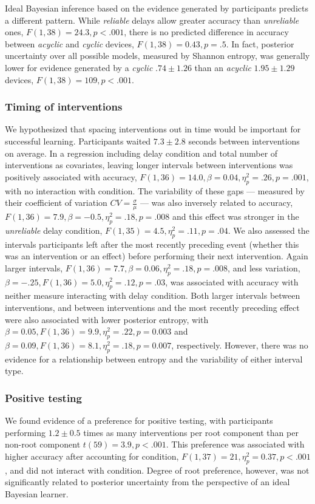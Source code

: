 \documentclass[10pt,letterpaper]{article}
\begin{document}
Ideal Bayesian inference based on the evidence generated by participants predicts a different pattern.  While \emph{reliable} delays allow greater accuracy than \emph{unreliable} ones, $F(1,38) = 24.3, p<.001$, there is no predicted difference in accuracy between \emph{acyclic} and \emph{cyclic} devices, $F(1, 38)= 0.43, p=.5$.  In fact, posterior uncertainty over all possible models, measured by Shannon entropy, was generally lower for evidence generated by a \emph{cyclic} $.74\pm1.26$ than an \emph{acyclic} $1.95\pm1.29$ devices, $F(1,38) = 109, p<.001$.%

\subsubsection{Timing of interventions}

We hypothesized that spacing interventions out in time would be important for successful learning.  Participants waited $7.3\pm2.8$ seconds between interventions on average.  In a regression including delay condition and total number of interventions as covariates, leaving longer intervals between interventions was positively associated with accuracy, $F(1,36)=14.0, \beta = 0.04, \eta^2_p=.26, p=.001$, with no interaction with condition.  The variability of these gaps --- measured by their coefficient of variation $CV = \frac{\sigma}{\mu}$ --- was also inversely related to accuracy, $F(1,36)=7.9, \beta = -0.5, \eta^2_p=.18, p=.008$ and this effect was stronger in the \emph{unreliable} delay condition, $F(1,35) = 4.5, \eta^2_p=.11, p=.04$.  We also assessed the intervals participants left after the most recently preceding event (whether this was an intervention or an effect) before performing their next intervention.  Again larger intervals, $F(1,36)=7.7, \beta = 0.06, \eta^2_p=.18, p=.008$, and less variation, $\beta=-.25, F(1,36)=5.0, \eta^2_p=.12, p=.03$, was associated with accuracy with neither measure interacting with delay condition. 
Both larger intervals between interventions, and between interventions and the most recently preceding effect were also associated with lower posterior entropy, with $\beta=0.05, F(1,36)=9.9, \eta^2_p=.22, p=0.003$ and $\beta=0.09, F(1,36)=8.1, \eta^2_p=.18, p=0.007$, respectively.  However, there was no evidence for a relationship between entropy and the variability of either interval type.

\subsubsection{Positive testing}
We found evidence of a preference for positive testing, with participants performing $1.2\pm0.5$ times as many interventions per root component than per non-root component $t(59) = 3.9, p<.001$. 
This preference was associated with higher accuracy after accounting for condition, $F(1,37) = 21, \eta^2_p = 0.37, p<.001$, and did not interact with condition.  Degree of root preference, however, was not significantly related to posterior uncertainty from the perspective of an ideal Bayesian learner.
\end{document}
